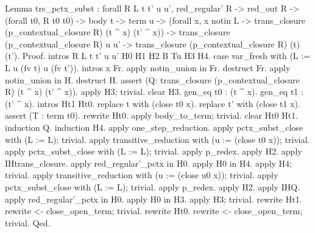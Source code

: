 \documentclass[12pt]{report}
\begin{document}
Lemma trs\_pctx\_subst : forall R L t t' u u', red\_regular' R -> red\_out R -> (forall t0, R t0 t0) -> 
                        body t -> term u ->
                       (forall x, x notin L ->  trans\_closure (p\_contextual\_closure R) (t \^{} x) (t' \^{} x)) -> 
                       trans\_closure (p\_contextual\_closure R) u u' ->
                       trans\_closure (p\_contextual\_closure R) (t) (t').
Proof.
 intros R L t t' u u' H0 H1 H2 B Tu H3 H4.  case var\_fresh with (L := L u (fv t) u (fv t')). intros x Fr.
 apply notin\_union in Fr. destruct Fr. apply notin\_union in H. destruct H.
 assert (Q: trans\_closure (p\_contextual\_closure R) (t \^{} x) (t' \^{} x)). apply H3; trivial. clear H3.
 gen\_eq t0 : (t \^{} x). gen\_eq t1 : (t' \^{} x). intros Ht1 Ht0.
 replace t with (close t0 x). replace t' with (close t1 x).
 assert (T : term t0). rewrite Ht0. apply body\_to\_term; trivial.
 clear Ht0 Ht1. induction Q. induction H4.
 apply one\_step\_reduction. apply pctx\_subst\_close with (L := L); trivial.
 apply transitive\_reduction with (u := (close t0 x)); trivial.
 apply pctx\_subst\_close with (L := L); trivial. apply p\_redex. apply H2. 
 apply IHtrans\_closure. apply red\_regular'\_pctx in H0. apply H0 in H4. apply H4; trivial.
 apply transitive\_reduction with (u := (close u0 x)); trivial.
 apply pctx\_subst\_close with (L := L); trivial. apply p\_redex. apply H2. 
 apply IHQ. apply red\_regular'\_pctx in H0. apply H0 in H3. apply H3; trivial.
 rewrite Ht1. rewrite <- close\_open\_term; trivial. 
 rewrite Ht0. rewrite <- close\_open\_term; trivial.
Qed.
\end{document}
